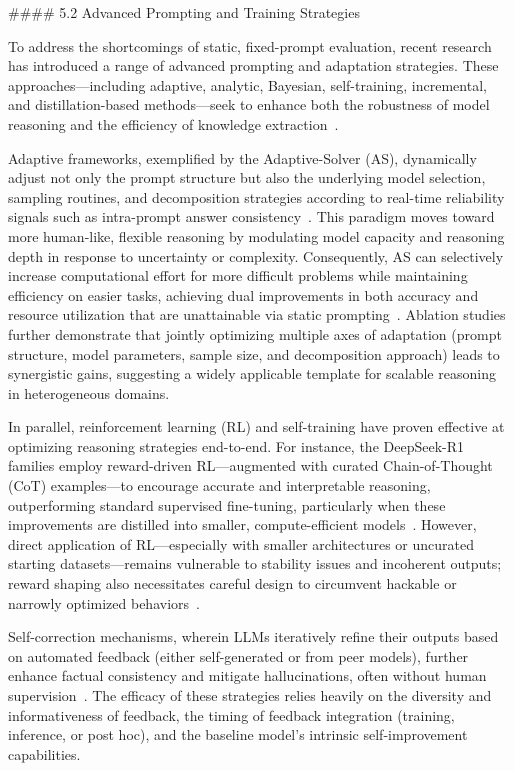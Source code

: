 \documentclass[11pt]{article}
\begin{document}
#### 5.2 Advanced Prompting and Training Strategies

To address the shortcomings of static, fixed-prompt evaluation, recent research has introduced a range of advanced prompting and adaptation strategies. These approaches—including adaptive, analytic, Bayesian, self-training, incremental, and distillation-based methods—seek to enhance both the robustness of model reasoning and the efficiency of knowledge extraction~\cite{1,4,6,49,56,57,68,86,103}.

Adaptive frameworks, exemplified by the Adaptive-Solver (AS), dynamically adjust not only the prompt structure but also the underlying model selection, sampling routines, and decomposition strategies according to real-time reliability signals such as intra-prompt answer consistency~\cite{57}. This paradigm moves toward more human-like, flexible reasoning by modulating model capacity and reasoning depth in response to uncertainty or complexity. Consequently, AS can selectively increase computational effort for more difficult problems while maintaining efficiency on easier tasks, achieving dual improvements in both accuracy and resource utilization that are unattainable via static prompting~\cite{57}. Ablation studies further demonstrate that jointly optimizing multiple axes of adaptation (prompt structure, model parameters, sample size, and decomposition approach) leads to synergistic gains, suggesting a widely applicable template for scalable reasoning in heterogeneous domains.

In parallel, reinforcement learning (RL) and self-training have proven effective at optimizing reasoning strategies end-to-end. For instance, the DeepSeek-R1 families employ reward-driven RL—augmented with curated Chain-of-Thought (CoT) examples—to encourage accurate and interpretable reasoning, outperforming standard supervised fine-tuning, particularly when these improvements are distilled into smaller, compute-efficient models~\cite{56,103}. However, direct application of RL—especially with smaller architectures or uncurated starting datasets—remains vulnerable to stability issues and incoherent outputs; reward shaping also necessitates careful design to circumvent hackable or narrowly optimized behaviors~\cite{56,103}.

Self-correction mechanisms, wherein LLMs iteratively refine their outputs based on automated feedback (either self-generated or from peer models), further enhance factual consistency and mitigate hallucinations, often without human supervision~\cite{68}. The efficacy of these strategies relies heavily on the diversity and informativeness of feedback, the timing of feedback integration (training, inference, or post hoc), and the baseline model's intrinsic self-improvement capabilities.
\end{document}
